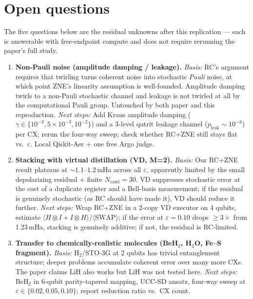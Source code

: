 \section{Open questions}

The five questions below are the residual unknowns after this replication --- 
each is answerable with free-endpoint compute and does not require rerunning
the paper's full study.

\begin{enumerate}
  \item \textbf{Non-Pauli noise (amplitude damping / leakage).}
        \emph{Basis:} RC's argument requires that twirling turns coherent noise
        into stochastic \emph{Pauli} noise, at which point ZNE's linearity
        assumption is well-founded. Amplitude damping twirls to a non-Pauli
        stochastic channel and leakage is not twirled at all by the
        computational Pauli group. Untouched by both paper and this
        reproduction.
        \emph{Next steps:} Add Kraus amplitude damping ($\gamma\in\{10^{-3},
        5\!\times\!10^{-3},10^{-2}\}$) and a 3-level qutrit leakage channel
        ($p_{\text{leak}}\!\sim\!10^{-3}$) per CX; rerun the four-way sweep;
        check whether RC+ZNE still stays flat vs.~$\varepsilon$. Local
        Qiskit-Aer + one free Argo judge.

  \item \textbf{Stacking with virtual distillation (VD, M=2).}
        \emph{Basis:} Our RC+ZNE result plateaus at $\sim\!1.1$--$1.2$\,mHa
        across all $\varepsilon$, apparently limited by the small depolarizing
        residual $+$ finite $N_{\text{rand}}=30$. VD suppresses stochastic
        error at the cost of a duplicate register and a Bell-basis measurement;
        if the residual is genuinely stochastic (as RC should have made it),
        VD should reduce it further.
        \emph{Next steps:} Wrap RC+ZNE in a 2-copy VD executor on 4 qubits,
        estimate $\langle H\otimes I + I\otimes H\rangle/\langle
        \text{SWAP}\rangle$; if the error at $\varepsilon=0.10$ drops
        $\geq\!3\times$ from 1.23\,mHa, stacking is genuinely additive; if not,
        the residual is RC-limited.

  \item \textbf{Transfer to chemically-realistic molecules (BeH$_2$, H$_2$O,
        Fe--S fragment).}
        \emph{Basis:} H$_2$/STO-3G at 2 qubits has trivial entanglement
        structure; deeper problems accumulate coherent error over many more
        CXs. The paper claims LiH also works but LiH was not tested here.
        \emph{Next steps:} BeH$_2$ in 6-qubit parity-tapered mapping, UCC-SD
        ansatz, four-way sweep at $\varepsilon\in\{0.02,0.05,0.10\}$; report
        reduction ratio vs.~CX count.


\end{enumerate}

